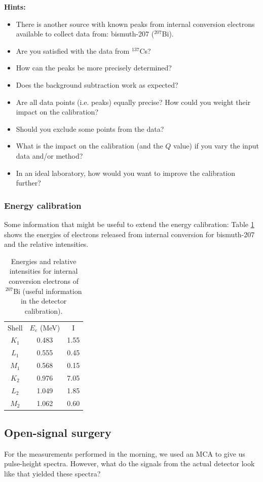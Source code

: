 \documentclass[a4,11pt, notitlepage]{article}
\begin{document}
\noindent\textbf{Hints:}
\begin{itemize}
\item There is another source with known peaks from internal
  conversion electrons available to collect data from: bismuth-207
  ($^{207}$Bi).
\item Are you satisfied with the data from $^{137}$Cs?
\item How can the peaks be more precisely determined?
\item Does the background subtraction work as expected?
\item Are all data points (i.e. peaks) equally precise? How could you
  weight their impact on the calibration?
\item Should you exclude some points from the data?
\item What is the impact on the calibration (and the $Q$ value) if you
  vary the input data and/or method?
\item In an ideal laboratory, how would you want to improve the
  calibration further?
\end{itemize}

\subsubsection{Energy calibration}
\label{sec:energy-calib}

Some information that might be useful to extend the energy
calibration: Table \ref{tab:calib} shows the energies of electrons released from
internal conversion for bismuth-207 and the relative intensities.

\begin{table}[h]
\caption{Energies and relative intensities for internal conversion
  electrons of $^{207}$Bi (useful information in the detector calibration).}
\label{tab:calib}
\centering
\begin{tabular}{ccc}
Shell & $E_{e}$ (MeV) & I \\
$K_1$ & 0.483 & 1.55 \\
$L_1$ & 0.555 & 0.45 \\
$M_1$ & 0.568 & 0.15 \\
$K_2$ & 0.976 & 7.05 \\
$L_2$ & 1.049 & 1.85 \\
$M_2$ & 1.062 & 0.60 
\end{tabular}
\end{table}


\subsection{Open-signal surgery}
\label{sec:}
For the measurements performed in the morning, we used an MCA to
give us pulse-height spectra. However, what do the signals from the
actual detector look like that yielded these spectra?
\end{document}
